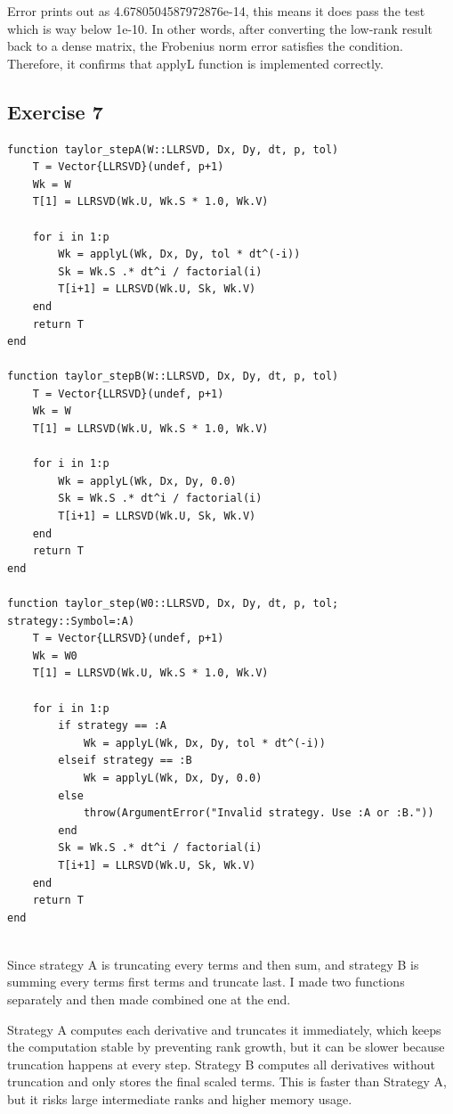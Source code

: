 \documentclass[11pt]{article}
\begin{document}
Error prints out as 4.6780504587972876e-14, this means it does pass the test which is way below 1e-10. In other words, after converting the low-rank result back to a dense matrix, the Frobenius norm error satisfies the condition. Therefore, it confirms that applyL function is implemented correctly.

\subsection*{Exercise 7}
\begin{lstlisting}
function taylor_stepA(W::LLRSVD, Dx, Dy, dt, p, tol)
    T = Vector{LLRSVD}(undef, p+1)
    Wk = W
    T[1] = LLRSVD(Wk.U, Wk.S * 1.0, Wk.V)

    for i in 1:p
        Wk = applyL(Wk, Dx, Dy, tol * dt^(-i))
        Sk = Wk.S .* dt^i / factorial(i)
        T[i+1] = LLRSVD(Wk.U, Sk, Wk.V)
    end
    return T
end

function taylor_stepB(W::LLRSVD, Dx, Dy, dt, p, tol)
    T = Vector{LLRSVD}(undef, p+1)
    Wk = W
    T[1] = LLRSVD(Wk.U, Wk.S * 1.0, Wk.V)

    for i in 1:p
        Wk = applyL(Wk, Dx, Dy, 0.0)
        Sk = Wk.S .* dt^i / factorial(i)
        T[i+1] = LLRSVD(Wk.U, Sk, Wk.V)
    end
    return T
end

function taylor_step(W0::LLRSVD, Dx, Dy, dt, p, tol; strategy::Symbol=:A)
    T = Vector{LLRSVD}(undef, p+1)
    Wk = W0
    T[1] = LLRSVD(Wk.U, Wk.S * 1.0, Wk.V)

    for i in 1:p
        if strategy == :A
            Wk = applyL(Wk, Dx, Dy, tol * dt^(-i))
        elseif strategy == :B
            Wk = applyL(Wk, Dx, Dy, 0.0)
        else
            throw(ArgumentError("Invalid strategy. Use :A or :B."))
        end
        Sk = Wk.S .* dt^i / factorial(i)
        T[i+1] = LLRSVD(Wk.U, Sk, Wk.V)
    end
    return T
end


\end{lstlisting}

Since strategy A is truncating every terms and then sum, and strategy B is summing every terms first terms and truncate last. I made two functions separately and then made combined one at the end. 

\vspace{0.8em}

Strategy A computes each derivative and truncates it immediately, which keeps the computation stable by preventing rank growth, but it can be slower because truncation happens at every step.
Strategy B computes all derivatives without truncation and only stores the final scaled terms. This is faster than Strategy A, but it risks large intermediate ranks and higher memory usage.
\end{document}
